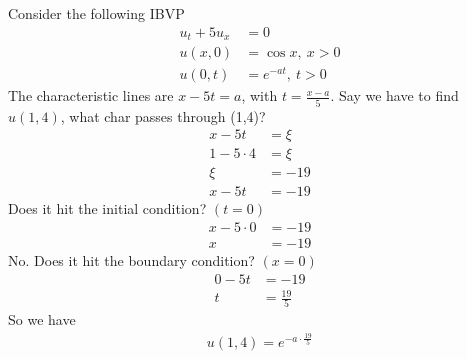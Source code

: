 \documentclass[12pt, letterpaper]{article}
\begin{document}
 Consider the following IBVP
\begin{align*}
    u_t + 5u_x &= 0 \\
    u(x,0) &= \cos x,\ x > 0 \\
    u(0,t) &= e^{-at},\ t > 0
\end{align*}
The characteristic lines are $x - 5t = a$, with $t = \frac{x-a}{5}$. Say
we have to find $u(1,4)$, what char passes through (1,4)?
\begin{align*}
    x-5t &= \xi \\
    1 - 5 \cdot 4 &= \xi \\
    \xi &= -19 \\
    x-5t &= -19
\end{align*}
Does it hit the initial condition? $(t=0)$
\begin{align*}
    x - 5 \cdot 0 &= -19 \\
    x &= -19
\end{align*}
No. Does it hit the boundary condition? $(x = 0)$
\begin{align*}
    0 - 5t &= -19 \\
    t &= \frac{19}{5}
\end{align*}
So we have 
\begin{align*}
    u(1,4) = e^{-a\cdot \frac{19}{5}}
\end{align*}
\end{document}
